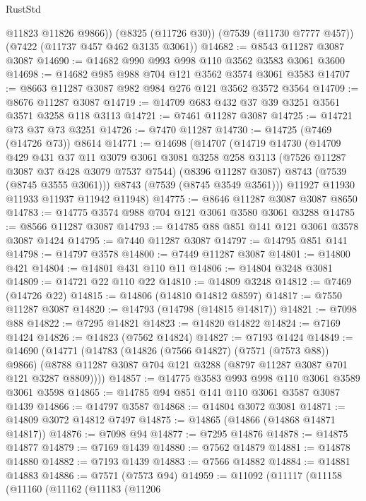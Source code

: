 \begin{lexlean}{RustStd}
\begin{coremodule}
        @11823
        @11826
        @9866))
    (@8325 (@11726 @30))
    (@7539 (@11730 @7777 @457))
    (@7422 (@11737 @457 @462 @3135 @3061))
@14682 := @8543 @11287 @3087 @3087
@14690 := @14682 @990 @993 @998 @110 @3562 @3583 @3061 @3600
@14698 := @14682 @985 @988 @704 @121 @3562 @3574 @3061 @3583
@14707 := @8663 @11287 @3087 @982 @984 @276 @121 @3562 @3572 @3564
@14709 := @8676 @11287 @3087
@14719 := @14709 @683 @432 @37 @39 @3251 @3561 @3571 @3258 @118 @3113
@14721 := @7461 @11287 @3087
@14725 := @14721 @73 @37 @73 @3251
@14726 := @7470 @11287
@14730 := @14725 (@7469 (@14726 @73)) @8614
@14771 := @14698
    (@14707
      (@14719
        @14730
        (@14709
          @429
          @431
          @37
          @11
          @3079
          @3061
          @3081
          @3258
          @258
          @3113
          (@7526 @11287 @3087 @37 @428 @3079 @7537 @7544)
          (@8396 @11287 @3087)
          @8743
          (@7539 (@8745 @3555 @3061)))
        @8743
        (@7539 (@8745 @3549 @3561)))
      @11927
      @11930
      @11933
      @11937
      @11942
      @11948)
@14775 := @8646 @11287 @3087 @3087 @8650
@14783 := @14775 @3574 @988 @704 @121 @3061 @3580 @3061 @3288
@14785 := @8566 @11287 @3087
@14793 := @14785 @88 @851 @141 @121 @3061 @3578 @3087 @1424
@14795 := @7440 @11287 @3087
@14797 := @14795 @851 @141
@14798 := @14797 @3578
@14800 := @7449 @11287 @3087
@14801 := @14800 @421
@14804 := @14801 @431 @110 @11
@14806 := @14804 @3248 @3081
@14809 := @14721 @22 @110 @22
@14810 := @14809 @3248
@14812 := @7469 (@14726 @22)
@14815 := @14806 (@14810 @14812 @8597)
@14817 := @7550 @11287 @3087
@14820 := @14793 (@14798 (@14815 @14817))
@14821 := @7098 @88
@14822 := @7295 @14821
@14823 := @14820 @14822
@14824 := @7169 @1424
@14826 := @14823 (@7562 @14824)
@14827 := @7193 @1424
@14849 := @14690
    (@14771
      (@14783
        (@14826 (@7566 @14827) (@7571 (@7573 @88)) @9866)
        (@8788 @11287 @3087 @704 @121 @3288 (@8797 @11287 @3087 @701 @121 @3287 @8809))))
@14857 := @14775 @3583 @993 @998 @110 @3061 @3589 @3061 @3598
@14865 := @14785 @94 @851 @141 @110 @3061 @3587 @3087 @1439
@14866 := @14797 @3587
@14868 := @14804 @3072 @3081
@14871 := @14809 @3072 @14812 @7497
@14875 := @14865 (@14866 (@14868 @14871 @14817))
@14876 := @7098 @94
@14877 := @7295 @14876
@14878 := @14875 @14877
@14879 := @7169 @1439
@14880 := @7562 @14879
@14881 := @14878 @14880
@14882 := @7193 @1439
@14883 := @7566 @14882
@14884 := @14881 @14883
@14886 := @7571 (@7573 @94)
@14959 := @11092
    (@11117
      (@11158
        (@11160
          (@11162
            (@11183
              (@11206

\end{coremodule}
\end{lexlean}
